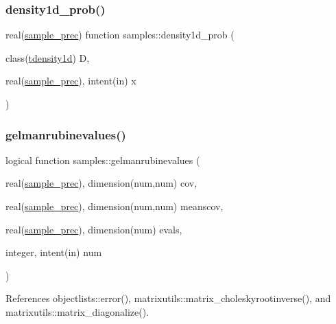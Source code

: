 \mbox{\label{namespacesamples_afdfd2cef6249d2d52f60f3b946035016}} 
\subsubsection{\texorpdfstring{density1d\+\_\+prob()}{density1d\_prob()}}
{\footnotesize\ttfamily real(\mbox{\hyperlink{namespacesamples_ab1a059d29fb6ed2517c01f6aef7713d3}{sample\+\_\+prec}}) function samples\+::density1d\+\_\+prob (\begin{DoxyParamCaption}\item[{class(\mbox{\hyperlink{structsamples_1_1tdensity1d}{tdensity1d}})}]{D,  }\item[{real(\mbox{\hyperlink{namespacesamples_ab1a059d29fb6ed2517c01f6aef7713d3}{sample\+\_\+prec}}), intent(in)}]{x }\end{DoxyParamCaption})}

\mbox{\label{namespacesamples_abaa5a3a56f0160fff42cc0ea3ac8a928}} 
\subsubsection{\texorpdfstring{gelmanrubinevalues()}{gelmanrubinevalues()}}
{\footnotesize\ttfamily logical function samples\+::gelmanrubinevalues (\begin{DoxyParamCaption}\item[{real(\mbox{\hyperlink{namespacesamples_ab1a059d29fb6ed2517c01f6aef7713d3}{sample\+\_\+prec}}), dimension(num,num)}]{cov,  }\item[{real(\mbox{\hyperlink{namespacesamples_ab1a059d29fb6ed2517c01f6aef7713d3}{sample\+\_\+prec}}), dimension(num,num)}]{meanscov,  }\item[{real(\mbox{\hyperlink{namespacesamples_ab1a059d29fb6ed2517c01f6aef7713d3}{sample\+\_\+prec}}), dimension(num)}]{evals,  }\item[{integer, intent(in)}]{num }\end{DoxyParamCaption})}



References objectlists\+::error(), matrixutils\+::matrix\+\_\+choleskyrootinverse(), and matrixutils\+::matrix\+\_\+diagonalize().



